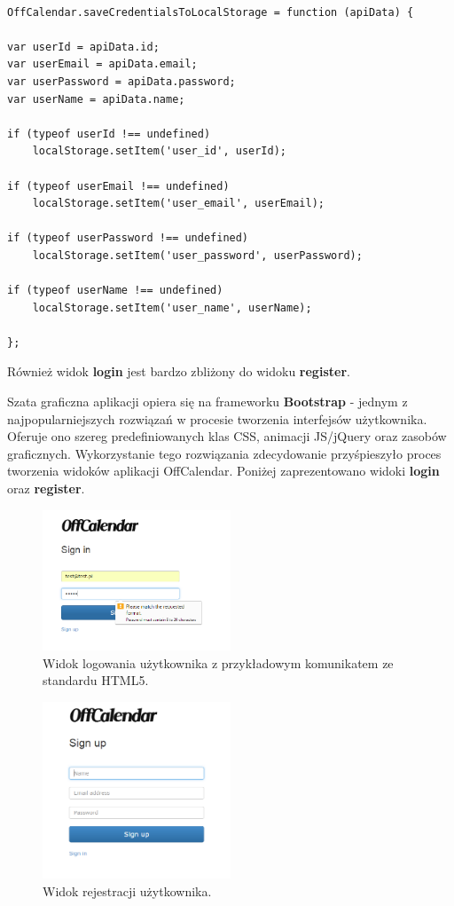 \begin{lstlisting}[caption=Zapis danych logowania do obiektu localStorage w pamięci podręcznej przeglądarki., label=amb, captionpos=b]

OffCalendar.saveCredentialsToLocalStorage = function (apiData) {

var userId = apiData.id;
var userEmail = apiData.email;
var userPassword = apiData.password;
var userName = apiData.name;

if (typeof userId !== undefined)
    localStorage.setItem('user_id', userId);

if (typeof userEmail !== undefined)
    localStorage.setItem('user_email', userEmail);

if (typeof userPassword !== undefined)
    localStorage.setItem('user_password', userPassword);

if (typeof userName !== undefined)
    localStorage.setItem('user_name', userName);

};

\end{lstlisting}

Również widok \textbf{login} jest bardzo zbliżony do widoku \textbf{register}.

Szata graficzna aplikacji opiera się na frameworku \textbf{Bootstrap} - jednym z najpopularniejszych rozwiązań w procesie tworzenia interfejsów użytkownika. Oferuje ono szereg predefiniowanych klas CSS, animacji JS/jQuery oraz zasobów graficznych. Wykorzystanie tego rozwiązania zdecydowanie przyśpieszyło proces tworzenia widoków aplikacji OffCalendar. Poniżej zaprezentowano widoki \textbf{login} oraz \textbf{register}.

\begin{figure}[H]
\centering
\includegraphics[width=0.5\textwidth]{signin.png}
\caption{Widok logowania użytkownika z przykładowym komunikatem ze standardu HTML5.}
\end{figure}

\begin{figure}[H]
\centering
\includegraphics[width=0.5\textwidth]{register.png}
\caption{Widok rejestracji użytkownika.}
\end{figure}

